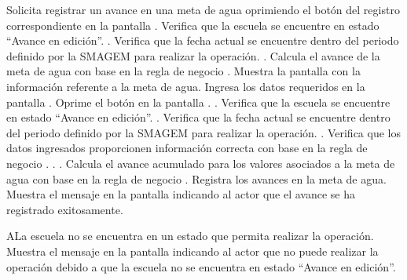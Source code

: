  \begin{UCtrayectoria}
    \UCpaso[\UCactor] Solicita registrar un avance en una meta de agua oprimiendo el botón \botMetas del registro correspondiente en la pantalla .
    \UCpaso[\UCsist] Verifica que la escuela se encuentre en estado ``Avance en edición''. .
    \UCpaso[\UCsist] Verifica que la fecha actual se encuentre dentro del periodo definido por la SMAGEM para realizar la operación. .
    \UCpaso[\UCsist] Calcula el avance de la meta de agua con base en la regla de negocio .
    \UCpaso[\UCsist] Muestra la pantalla  con la información referente a la meta de agua. 
    \UCpaso[\UCactor] Ingresa los datos requeridos en la pantalla . \label{cus20:RegAvanceAgua}
    \UCpaso[\UCactor] Oprime el botón  en la pantalla . .
    \UCpaso[\UCsist] Verifica que la escuela se encuentre en estado ``Avance en edición''. .
    \UCpaso[\UCsist] Verifica que la fecha actual se encuentre dentro del periodo definido por la SMAGEM para realizar la operación. .
    \UCpaso[\UCsist] Verifica que los datos ingresados proporcionen información correcta con base en la regla de negocio .  . .
    \UCpaso[\UCsist] Calcula el avance acumulado para los valores asociados a la meta de agua con base en la regla de negocio .
    \UCpaso[\UCsist] Registra los avances en la meta de agua.
    \UCpaso[\UCsist] Muestra el mensaje  en la pantalla  indicando al actor que el avance se ha registrado exitosamente.
 \end{UCtrayectoria}
 

    \begin{UCtrayectoriaA}{A}{La escuela no se encuentra en un estado que permita realizar la operación.}
	\UCpaso[\UCsist] Muestra el mensaje  en la pantalla  indicando al actor que no puede realizar la operación debido a que la escuela no se encuentra en estado ``Avance en edición''. 
    \end{UCtrayectoriaA}
 
